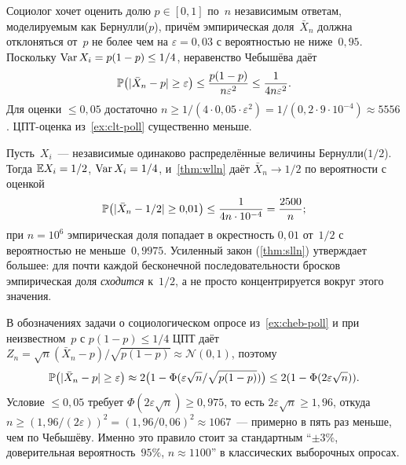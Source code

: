 \begin{example}
\label{ex:cheb-poll}
Социолог хочет оценить долю $p \in [0, 1]$ по~$n$ независимым ответам, моделируемым как Бернулли($p$), причём эмпирическая доля~$\bar X_n$ должна отклоняться от~$p$ не более чем на $\varepsilon = 0{,}03$ с вероятностью не ниже~$0{,}95$. Поскольку $\operatorname{Var} X_i = p(1-p) \leq 1/4$, неравенство Чебышёва даёт
\[
  \mathbb{P}\bigl(|\bar X_n - p| \geq \varepsilon\bigr) \leq \frac{p(1-p)}{n \varepsilon^2} \leq \frac{1}{4 n \varepsilon^2}.
\]
Для оценки $\leq 0{,}05$ достаточно $n \geq 1 / (4 \cdot 0{,}05 \cdot \varepsilon^2) = 1/(0{,}2 \cdot 9 \cdot 10^{-4}) \approx 5556$. ЦПТ-оценка из~\cref{ex:clt-poll} существенно меньше.
\end{example}

\begin{example}
\label{ex:wlln-coin}
Пусть~$X_i$~--- независимые одинаково распределённые величины Бернулли($1/2$). Тогда $\mathbb{E} X_i = 1/2$, $\operatorname{Var} X_i = 1/4$, и~\cref{thm:wlln} даёт $\bar X_n \to 1/2$ по вероятности с оценкой
\[
  \mathbb{P}\bigl(|\bar X_n - 1/2| \geq 0{,}01\bigr) \leq \frac{1}{4 n \cdot 10^{-4}} = \frac{2500}{n};
\]
при $n = 10^6$ эмпирическая доля попадает в окрестность $0{,}01$ от~$1/2$ с вероятностью не меньше~$0{,}9975$. Усиленный закон (\cref{thm:slln}) утверждает большее: для почти каждой бесконечной последовательности бросков эмпирическая доля \emph{сходится} к~$1/2$, а не просто концентрируется вокруг этого значения.
\end{example}

\begin{example}
\label{ex:clt-poll}
В обозначениях задачи о социологическом опросе из~\cref{ex:cheb-poll} и при неизвестном~$p$ с $p(1-p) \leq 1/4$ ЦПТ даёт $Z_n = \sqrt n (\bar X_n - p)/\sqrt{p(1-p)} \approx \mathcal{N}(0,1)$, поэтому
\[
  \mathbb{P}\bigl(|\bar X_n - p| \geq \varepsilon\bigr) \approx 2\bigl(1 - \Phi(\varepsilon \sqrt n / \sqrt{p(1-p)})\bigr) \leq 2(1 - \Phi(2 \varepsilon \sqrt n)).
\]
Условие $\leq 0{,}05$ требует $\Phi(2 \varepsilon \sqrt n) \geq 0{,}975$, то есть $2 \varepsilon \sqrt n \geq 1{,}96$, откуда $n \geq (1{,}96/(2 \varepsilon))^2 = (1{,}96/0{,}06)^2 \approx 1067$~--- примерно в пять раз меньше, чем по Чебышёву. Именно это правило стоит за стандартным ``$\pm 3\%$, доверительная вероятность~$95\%$, $n \approx 1100$'' в классических выборочных опросах.
\end{example}

